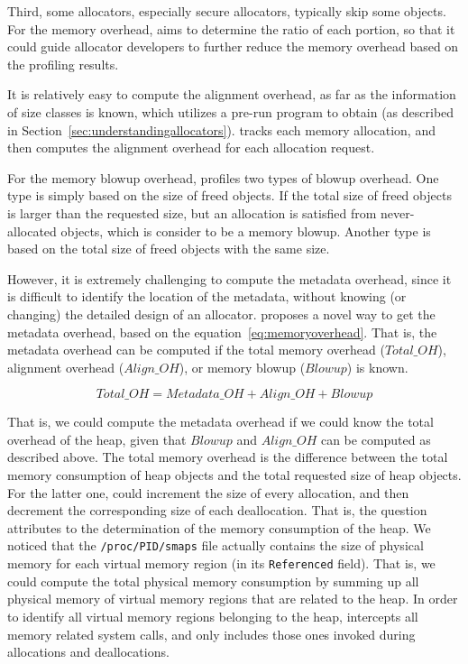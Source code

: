 Third, some allocators, especially secure allocators, typically skip some objects. For the memory overhead, \MP{} aims to determine the ratio of each portion, so that it could guide allocator developers to further reduce the memory overhead based on the profiling results. 


It is relatively easy to compute the alignment overhead, as far as the information of size classes is known, which \MP{} utilizes a pre-run program to obtain (as described in Section~\ref{sec:understandingallocators}). \MP{} tracks each memory allocation, and then computes the alignment overhead for each allocation request. 

For the memory blowup overhead, \MP{} profiles two types of blowup overhead. One type is simply based on the size of freed objects. If the total size of freed objects is larger than the requested size, but an allocation is satisfied from never-allocated objects, which is consider to be a memory blowup. Another type is based on the total size of freed objects with the same size.  

However, it is extremely challenging to compute  the metadata overhead, since it is difficult to identify the location of the metadata, without knowing (or changing) the detailed design of an allocator. \MP{} proposes a novel way to get the metadata overhead, based on the equation~\ref{eq:memoryoverhead}. That is, the metadata overhead can be computed if the total memory overhead ($Total\_{OH}$), alignment overhead ($Align\_{OH}$), or memory blowup ($Blowup$) is known.   

\begin{equation}
\label{eq:memoryoverhead}
Total\_{OH}=Metadata\_{OH}+Align\_{OH}+Blowup
\end{equation} 

That is, we could compute the metadata overhead if we could know the total overhead of the heap, given that $Blowup$ and $Align\_{OH}$ can be computed as described above. The total memory overhead is the difference between the total memory consumption of heap objects and the total requested size of heap objects. For the latter one,  \MP{} could increment the size of every allocation, and then decrement the corresponding size of each deallocation.  That is, the question attributes to the determination of the memory consumption of the heap. We noticed that the \texttt{/proc/PID/smaps} file actually contains the size of physical memory for each virtual memory region (in its \texttt{Referenced} field). That is, we could compute the total physical memory consumption by summing up all physical memory of virtual memory regions that are related to the heap. In order to identify all virtual memory regions belonging to the heap, \MP{} intercepts all memory related system calls, and only includes those ones invoked during allocations and deallocations. 

